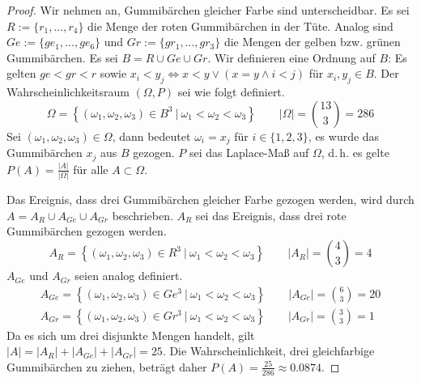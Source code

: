 \documentclass[a4paper]{scrartcl}
\newcommand{\gdw}{\Leftrightarrow}
\begin{document}
\begin{enumerate}[label=\bfseries\arabic*.]
        \begin{proof}
        Wir nehmen an, Gummibärchen gleicher Farbe sind unterscheidbar.
        Es sei $R := \{ r_1, \ldots, r_4 \}$ die Menge der roten Gummibärchen
        in der Tüte.
        Analog sind $Ge := \{ ge_1, \ldots, ge_6 \}$ und
        $Gr := \{ gr_1, \ldots, gr_3 \}$ die Mengen der gelben bzw. grünen
        Gummibärchen.
        Es sei $B = R \cup Ge \cup Gr$.
        Wir definieren eine Ordnung auf $B$: Es gelten $ge < gr < r$ sowie
        $x_i < y_j \gdw x < y \lor (x = y \land i < j)$ für $x_i, y_j \in B$.
        Der Wahrscheinlichkeitsraum $(\Omega, P)$ sei wie folgt definiert.
        \begin{equation}
            \Omega = \left\{ (\omega_1, \omega_2, \omega_3) \in B^3 \ \vert \ 
            \omega_1 < \omega_2 < \omega_3 \right\}
            \qquad
            |\Omega| = \binom{13}{3} = 286
        \end{equation}
        Sei $(\omega_1, \omega_2, \omega_3) \in \Omega$, dann bedeutet
        $\omega_i = x_j$ für $i \in \{ 1, 2, 3 \}$, es wurde das Gummibärchen
        $x_j$ aus $B$ gezogen.
        $P$ sei das Laplace-Maß auf $\Omega$, d.\,h. es gelte
        $P(A) = \frac{|A|}{|\Omega|}$ für alle $A \subset \Omega$.

        Das Ereignis, dass drei Gummibärchen gleicher Farbe gezogen werden, wird
        durch $A = A_R \cup A_{Ge} \cup A_{Gr}$ beschrieben.
        $A_R$ sei das Ereignis, dass drei rote Gummibärchen gezogen werden.
        \begin{equation}
            A_R = \left\{ (\omega_1, \omega_2, \omega_3) \in R^3 \ \vert \ 
            \omega_1 < \omega_2 < \omega_3 \right\}
            \qquad
            |A_R| = \binom{4}{3} = 4
        \end{equation}
        $A_{Ge}$ und $A_{Gr}$ seien analog definiert.
        \begin{gather}
            A_{Ge} = \left\{ (\omega_1, \omega_2, \omega_3) \in Ge^3 \ \vert \ 
            \omega_1 < \omega_2 < \omega_3 \right\}
            \qquad
            |A_{Ge}| = \binom{6}{3} = 20 \\
            A_{Gr} = \left\{ (\omega_1, \omega_2, \omega_3) \in Gr^3 \ \vert \ 
            \omega_1 < \omega_2 < \omega_3 \right\}
            \qquad
            |A_{Gr}| = \binom{3}{3} = 1
        \end{gather}
        Da es sich um drei disjunkte Mengen handelt, gilt
        $|A| = |A_R| + |A_{Ge}| + |A_{Gr}| = 25$.
        Die Wahrscheinlichkeit, drei gleichfarbige Gummibärchen zu ziehen,
        beträgt daher $P(A) = \frac{25}{286} \approx \num{0,0874}$.
        \end{proof}
    

\end{enumerate}
\end{document}
